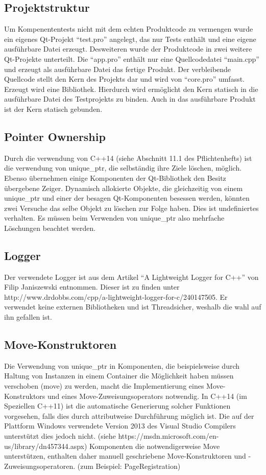 \subsection{Projektstruktur}
Um Kompenententests nicht mit dem echten Produktcode zu vermengen wurde ein eigenes Qt-Projekt \enquote{test.pro}
angelegt, das nur Tests enthält und eine eigene ausführbare Datei erzeugt. Desweiteren wurde der Produktcode in zwei weitere Qt-Projekte unterteilt. Die \enquote{app.pro} enthält nur eine Quellcodedatei \enquote{main.cpp} und erzeugt als ausführbare Datei das fertige Produkt. Der verbleibende Quellcode stellt den Kern des Projekts dar und wird von \enquote{core.pro} umfasst. Erzeugt wird eine Bibliothek. Hierdurch wird ermöglicht den Kern statisch in die ausführbare Datei des Testprojekts zu binden. Auch in das ausführbare Produkt ist der Kern statisch gebunden.

\subsection{Pointer Ownership}
Durch die verwendung von C++14 (siehe Abschnitt 11.1 des Pflichtenhefts) ist die verwendung von unique\_ptr, die selbständig ihre Ziele löschen, möglich. Ebenso übernehmen einige Komponenten der Qt-Bibliothek den Besitz übergebene Zeiger. Dynamisch allokierte Objekte, die gleichzeitig von einem unique\_ptr und einer der besagen Qt-Komponenten besessen werden, könnten zwei Versuche das selbe Objekt zu löschen zur Folge haben. Dies ist undefiniertes verhalten. Es müssen beim Verwenden von unique\_ptr also mehrfache Löschungen beachtet werden.

\subsection{Logger}
Der verwendete Logger ist aus dem Artikel \enquote{A Lightweight Logger for C++} von Filip Janiszewski entnommen.
Dieser ist zu finden unter http://www.drdobbs.com/cpp/a-lightweight-logger-for-c/240147505.
Er verwendet keine externen Bibliotheken und ist Threadsicher, weshalb die wahl auf ihn gefallen ist.

\subsection{Move-Konstruktoren}
Die Verwendung von unique\_ptr in Komponenten, die beispielsweise durch Haltung von Instanzen in einem Container die Möglichkeit haben müssen verschoben (move) zu werden, macht die Implementierung eines Move-Konstruktors und eines Move-Zuweisungsoperators notwendig. In C++14 (im Speziellen C++11) ist die automatische Generierung solcher Funktionen vorgesehen, falls dies durch attributweise Durchführung möglich ist. Die auf der Plattform Windows verwendete Version 2013 des Visual Studio Compilers unterstützt dies jedoch nicht. (siehe https://msdn.microsoft.com/en-us/library/dn457344.aspx)
Komponenten die notwendigerweise Move unterstützen, enthalten daher manuell geschriebene Move-Konstruktoren und -Zuweisungsoperatoren. (zum Beispiel: PageRegistration)

